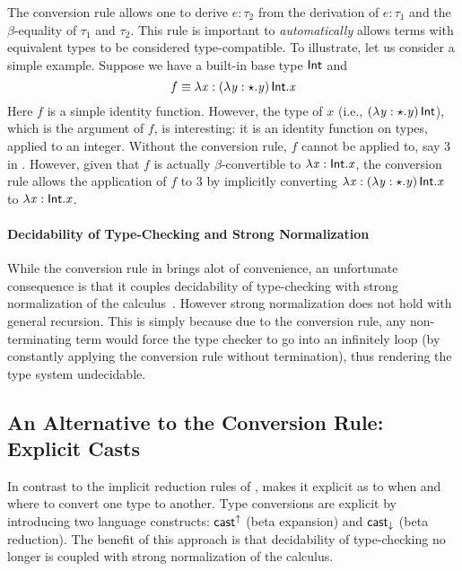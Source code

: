 The conversion rule allows one to derive $e:\tau_{{\mathrm{2}}}$ from the
derivation of $e:\tau_{{\mathrm{1}}}$ and the $\beta$-equality of $\tau_{{\mathrm{1}}}$ and
$\tau_{{\mathrm{2}}}$. This rule is important to \emph{automatically} allows 
terms with equivalent types to be considered type-compatible. 
To illustrate, let us consider a simple example. Suppose
we have a built-in base type $ \mathsf{Int} $ and \[f \equiv \lambda  \mathit{x}  :  (  \lambda  \mathit{y}  :  \star  .  \mathit{y}  ) \, \mathsf{Int}  .  \mathit{x} \]
Here $f$ is a simple identity function. However, the type 
of $x$ (i.e., $(  \lambda  \mathit{y}  :  \star  .  \mathit{y}  ) \, \mathsf{Int}$), which is the argument of $f$, is interesting: it is 
an identity function on types, applied to an integer. 
Without the conversion rule, $f$ cannot be
applied to, say $3$ in \coc. However, given that $f$ is actually
$\beta$-convertible to $\lambda  \mathit{x}  :  \mathsf{Int}  .  \mathit{x}$, the conversion rule allows
the application of $f$ to $3$ by implicitly converting
$\lambda  \mathit{x}  :  (  \lambda  \mathit{y}  :  \star  .  \mathit{y}  ) \, \mathsf{Int}  .  \mathit{x}$ to $\lambda  \mathit{x}  :  \mathsf{Int}  .  \mathit{x}$.

\paragraph{Decidability of Type-Checking and Strong Normalization} 
While the conversion rule in \coc brings alot of convenience, an unfortunate
consequence is that it couples decidability of type-checking with 
strong normalization of the calculus~\cite{coc:decidability}. 
However strong normalization does not
hold with general recursion. This is simply because due to the
conversion rule, any non-terminating term would force the type checker
to go into an infinitely loop (by constantly applying the conversion
rule without termination), thus rendering the type system undecidable.

\subsection{An Alternative to the Conversion Rule: Explicit Casts}

In contrast to the implicit reduction rules of \coc, \name makes it
explicit as to when and where to convert one type to another. Type
conversions are explicit by introducing two language constructs: $ \mathsf{cast}^{\uparrow} $
(beta expansion) and $ \mathsf{cast}_{\downarrow} $ (beta reduction). The benefit of
this approach is that decidability of type-checking no longer is
coupled with strong normalization of the calculus.

